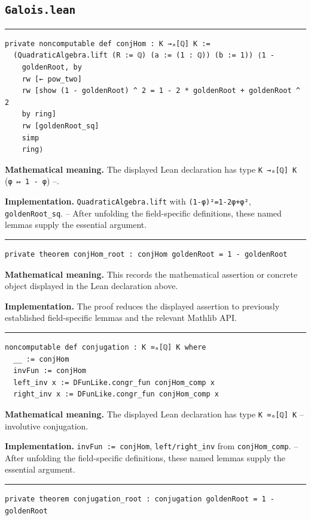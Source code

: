 \documentclass[UTF8,a4paper,11pt,fontset=fandol]{ctexart}
\theoremstyle{definition}
\newcommand{\statementsep}{\par\medskip\hrule\medskip}
\begin{document}
\subsection{\texttt{Galois.lean}}

\statementsep
\begin{verbatim}
private noncomputable def conjHom : K →ₐ[ℚ] K :=
  (QuadraticAlgebra.lift (R := ℚ) (a := (1 : ℚ)) (b := 1)) ⟨1 -
    goldenRoot, by
    rw [← pow_two]
    rw [show (1 - goldenRoot) ^ 2 = 1 - 2 * goldenRoot + goldenRoot ^ 2
    by ring]
    rw [goldenRoot_sq]
    simp
    ring⟩
\end{verbatim}
\noindent\textbf{Mathematical meaning.} The displayed Lean declaration has type \texttt{K →ₐ[ℚ] K} (\texttt{φ ↦ 1 - φ}) --.\par
\noindent\textbf{Implementation.} \texttt{QuadraticAlgebra.\allowbreak{}lift} with \texttt{(1-φ)²=1-2φ+φ²}, \texttt{goldenRoot\_\allowbreak{}sq}. -- After unfolding the field-specific definitions, these named lemmas supply the essential argument.\par
\statementsep
\begin{verbatim}
private theorem conjHom_root : conjHom goldenRoot = 1 - goldenRoot
\end{verbatim}
\noindent\textbf{Mathematical meaning.} This records the mathematical assertion or concrete object displayed in the Lean declaration above.\par
\noindent\textbf{Implementation.} The proof reduces the displayed assertion to previously established field-specific lemmas and the relevant Mathlib API.\par
\statementsep
\begin{verbatim}
noncomputable def conjugation : K ≃ₐ[ℚ] K where
  __ := conjHom
  invFun := conjHom
  left_inv x := DFunLike.congr_fun conjHom_comp x
  right_inv x := DFunLike.congr_fun conjHom_comp x
\end{verbatim}
\noindent\textbf{Mathematical meaning.} The displayed Lean declaration has type \texttt{K ≃ₐ[ℚ] K} -- involutive conjugation.\par
\noindent\textbf{Implementation.} \texttt{invFun := conjHom}, \texttt{left/\allowbreak{}right\_\allowbreak{}inv} from \texttt{conjHom\_\allowbreak{}comp}. -- After unfolding the field-specific definitions, these named lemmas supply the essential argument.\par
\statementsep
\begin{verbatim}
private theorem conjugation_root : conjugation goldenRoot = 1 - goldenRoot
\end{verbatim}
\end{document}
